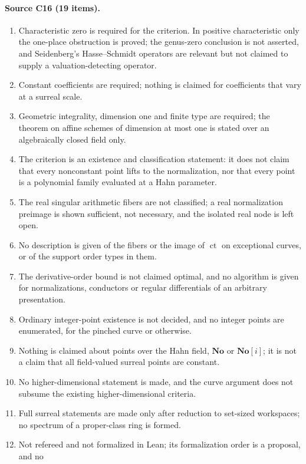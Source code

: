 \documentclass[11pt,oneside]{article}
\numberwithin{equation}{section}
\theoremstyle{definition}
\theoremstyle{remark}
\newcommand{\No}{\mathbf{No}}
\newcommand{\ct}{\operatorname{ct}}
\begin{document}
\paragraph{Source C16 (19 items).}
\begin{enumerate}[leftmargin=*,itemsep=1pt]
\item Characteristic zero is required for the criterion. In positive characteristic only
the one-place obstruction is proved; the genus-zero conclusion is not asserted, and
Seidenberg's Hasse--Schmidt operators are relevant but not claimed to supply a
valuation-detecting operator.
\item Constant coefficients are required; nothing is claimed for coefficients that vary at a
surreal scale.
\item Geometric integrality, dimension one and finite type are required; the theorem on
affine schemes of dimension at most one is stated over an algebraically closed field only.
\item The criterion is an existence and classification statement: it does not claim that
every nonconstant point lifts to the normalization, nor that every point is a polynomial
family evaluated at a Hahn parameter.
\item The real singular arithmetic fibers are not classified; a real normalization preimage
is shown sufficient, not necessary, and the isolated real node is left open.
\item No description is given of the fibers or the image of $\ct$ on exceptional curves, or
of the support order types in them.
\item The derivative-order bound is not claimed optimal, and no algorithm is given for
normalizations, conductors or regular differentials of an arbitrary presentation.
\item Ordinary integer-point existence is not decided, and no integer points are enumerated,
for the pinched curve or otherwise.
\item Nothing is claimed about points over the Hahn field, $\No$ or $\No[i]$; it is not a
claim that all field-valued surreal points are constant.
\item No higher-dimensional statement is made, and the curve argument does not subsume the
existing higher-dimensional criteria.
\item Full surreal statements are made only after reduction to set-sized workspaces; no
spectrum of a proper-class ring is formed.
\item Not refereed and not formalized in Lean; its formalization order is a proposal, and no

\end{enumerate}
\end{document}
